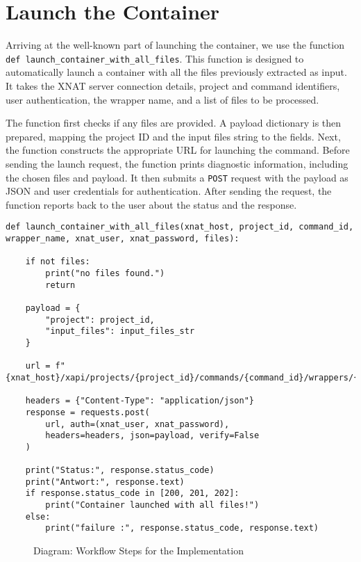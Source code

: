 \section{Launch the Container}

Arriving at the well-known part of launching the container, we use the function \texttt{def launch\_container\_with\_all\_files}. This function is designed to automatically launch a container with all the files previously extracted as input. It takes the XNAT server connection details, project and command identifiers, user authentication, the wrapper name, and a list of files to be processed.

The function first checks if any files are provided. A payload dictionary is then prepared, mapping the project ID and the input files string to the fields. Next, the function constructs the appropriate URL for launching the command. Before sending the launch request, the function prints diagnostic information, including the chosen files and payload. It then submits a \texttt{POST} request with the payload as JSON and user credentials for authentication. After sending the request, the function reports back to the user about the status and the response.

\begin{lstlisting}
def launch_container_with_all_files(xnat_host, project_id, command_id, wrapper_name, xnat_user, xnat_password, files):
   
    if not files:
        print("no files found.")
        return 

    payload = {
        "project": project_id,
        "input_files": input_files_str
    }

    url = f"{xnat_host}/xapi/projects/{project_id}/commands/{command_id}/wrappers/{wrapper_name}/root/project/launch"

    headers = {"Content-Type": "application/json"}
    response = requests.post(
        url, auth=(xnat_user, xnat_password),
        headers=headers, json=payload, verify=False
    )

    print("Status:", response.status_code)
    print("Antwort:", response.text)
    if response.status_code in [200, 201, 202]:
        print("Container launched with all files!")
    else:
        print("failure :", response.status_code, response.text)
\end{lstlisting}

\begin{figure}[ht]
    \centering
    \def\svgwidth{0.9\linewidth}
    
    \caption{Diagram: Workflow Steps for the Implementation}
    \label{fig:workflow-steps}
\end{figure}

